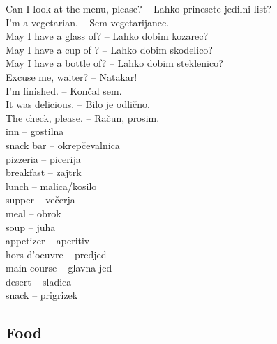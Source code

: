 Can I look at the menu, please? -- Lahko prinesete jedilni list?\\
I'm a vegetarian. -- Sem vegetarijanec.\\
May I have a glass of? -- Lahko dobim kozarec?\\
May I have a cup of ? -- Lahko dobim skodelico?\\
May I have a bottle of? -- Lahko dobim steklenico?\\
Excuse me, waiter? -- Natakar!\\
I'm finished. -- Končal sem.\\
It was delicious. -- Bilo je odlično.\\
The check, please. -- Račun, prosim.\\
inn -- gostilna\\
snack bar -- okrepčevalnica\\
pizzeria -- picerija\\
breakfast -- zajtrk\\
lunch -- malica/kosilo\\
supper -- večerja\\
meal -- obrok\\
soup -- juha\\
appetizer -- aperitiv\\
hors d'oeuvre -- predjed\\
main course -- glavna jed\\
desert -- sladica\\
snack -- prigrizek\\

\subsection{Food}



